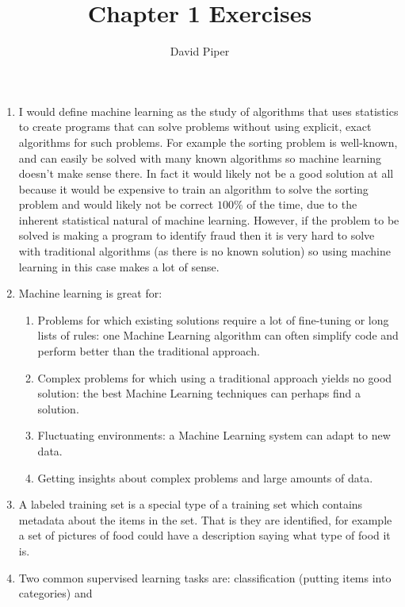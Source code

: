 \documentclass[12pt]{article}
\title{Chapter 1 Exercises}
\author{David Piper}
\begin{document}
\maketitle

\begin{enumerate}[label=\arabic*]
  \item I would define machine learning as the study of algorithms that uses statistics
        to create programs that can solve problems without using explicit, exact algorithms
        for such problems. For example the sorting problem is well-known, and can easily be solved
        with many known algorithms so machine learning doesn't make sense there. In fact it would
        likely not be a good solution at all because it would be expensive to train an algorithm to solve
        the sorting problem and would likely not be correct $100\%$ of the time, due to the inherent statistical
        natural of machine learning. However, if the problem to be solved is making a program to identify
        fraud then it is very hard to solve with traditional algorithms (as there is no known solution) so
        using machine learning in this case makes a lot of sense.
  \item Machine learning is great for:
        \begin{enumerate}[label=\arabic*]
          \item Problems for which existing solutions require a lot of fine-tuning
                or long lists of rules: one Machine Learning algorithm can often simplify code
                and perform better than the traditional approach.
          \item Complex problems for which using a traditional approach yields no good solution:
                the best Machine Learning techniques can perhaps find a solution.
          \item Fluctuating environments: a Machine Learning system can adapt to new data.
          \item Getting insights about complex problems and large amounts of data.
        \end{enumerate}
  \item A labeled training set is a special type of a training set which contains metadata about the items
        in the set. That is they are identified, for example a set of pictures of food could have a description saying what type of
        food it is.
  \item Two common supervised learning tasks are: classification (putting items into categories) and

\end{enumerate}
\end{document}
